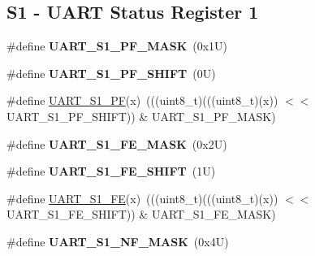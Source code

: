 \subsection*{S1 -\/ U\+A\+RT Status Register 1}
\begin{DoxyCompactItemize}
\item 
\mbox{\label{group___u_a_r_t___register___masks_ga4116bba67a2cf49c9623e62e3b499ee3}} 
\#define {\bfseries U\+A\+R\+T\+\_\+\+S1\+\_\+\+P\+F\+\_\+\+M\+A\+SK}~(0x1\+U)
\item 
\mbox{\label{group___u_a_r_t___register___masks_ga79ce3db2e0a8eaa687b01942adf36468}} 
\#define {\bfseries U\+A\+R\+T\+\_\+\+S1\+\_\+\+P\+F\+\_\+\+S\+H\+I\+FT}~(0\+U)
\item 
\#define \mbox{\hyperlink{group___u_a_r_t___register___masks_ga2bac368f791a24b95f7f99618b6c4200}{U\+A\+R\+T\+\_\+\+S1\+\_\+\+PF}}(x)~(((uint8\+\_\+t)(((uint8\+\_\+t)(x)) $<$$<$ U\+A\+R\+T\+\_\+\+S1\+\_\+\+P\+F\+\_\+\+S\+H\+I\+FT)) \& U\+A\+R\+T\+\_\+\+S1\+\_\+\+P\+F\+\_\+\+M\+A\+SK)
\item 
\mbox{\label{group___u_a_r_t___register___masks_ga83b62a5246fdb7f0aaaffb92074c9e0f}} 
\#define {\bfseries U\+A\+R\+T\+\_\+\+S1\+\_\+\+F\+E\+\_\+\+M\+A\+SK}~(0x2\+U)
\item 
\mbox{\label{group___u_a_r_t___register___masks_ga2795a7498ce3e3d09703c4cec6378531}} 
\#define {\bfseries U\+A\+R\+T\+\_\+\+S1\+\_\+\+F\+E\+\_\+\+S\+H\+I\+FT}~(1\+U)
\item 
\#define \mbox{\hyperlink{group___u_a_r_t___register___masks_ga04b763409625dda02fc70e246fe93896}{U\+A\+R\+T\+\_\+\+S1\+\_\+\+FE}}(x)~(((uint8\+\_\+t)(((uint8\+\_\+t)(x)) $<$$<$ U\+A\+R\+T\+\_\+\+S1\+\_\+\+F\+E\+\_\+\+S\+H\+I\+FT)) \& U\+A\+R\+T\+\_\+\+S1\+\_\+\+F\+E\+\_\+\+M\+A\+SK)
\item 
\mbox{\label{group___u_a_r_t___register___masks_gadfaa4f856facd373c0441b6e89bd87ba}} 
\#define {\bfseries U\+A\+R\+T\+\_\+\+S1\+\_\+\+N\+F\+\_\+\+M\+A\+SK}~(0x4\+U)
\item 
\mbox{\label{group___u_a_r_t___register___masks_ga7b2eb195cce2f086cd1b0c136eced375}} 

\end{DoxyCompactItemize}
